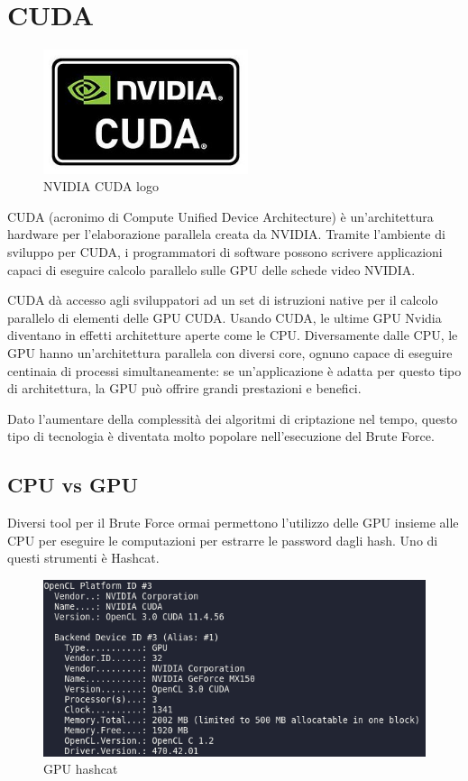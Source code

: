 \chapter{CUDA}


\begin{figure}[ht]
    \centering
    \includegraphics[width=60mm]{Immagini/7/Nvidia_CUDA_Logo.jpg}
    \caption{NVIDIA CUDA logo}
    \label{fig:CPU vs GPU}
\end{figure}

CUDA\cite{hendarto2017performance} (acronimo di Compute Unified Device Architecture) è un'architettura hardware per l'elaborazione parallela creata da NVIDIA. Tramite l'ambiente di sviluppo per CUDA, i programmatori di software possono scrivere applicazioni capaci di eseguire calcolo parallelo sulle GPU delle schede video NVIDIA.

CUDA dà accesso agli sviluppatori ad un set di istruzioni native per il calcolo parallelo di elementi delle GPU CUDA. Usando CUDA, le ultime GPU Nvidia diventano in effetti architetture aperte come le CPU. Diversamente dalle CPU, le GPU hanno un'architettura parallela con diversi core, ognuno capace di eseguire centinaia di processi simultaneamente: se un'applicazione è adatta per questo tipo di architettura, la GPU può offrire grandi prestazioni e benefici.

Dato l'aumentare della complessità dei algoritmi di criptazione nel tempo, questo tipo di tecnologia è diventata molto popolare nell'esecuzione del Brute Force. 

\section{CPU vs GPU}

Diversi tool per il Brute Force ormai permettono l'utilizzo delle GPU insieme alle CPU per eseguire le computazioni per estrarre le password dagli hash. Uno di questi strumenti è Hashcat.

\begin{figure}[ht]
    \centering
    \includegraphics[width=\linewidth]{Immagini/7/GPU_hashcat.png}
    \caption{GPU hashcat}
\end{figure}

